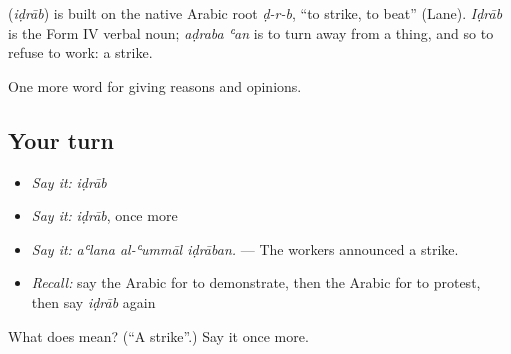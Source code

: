 \begin{cousinweb}
\textbf{} (\emph{iḍrāb}) is built on the native Arabic root \emph{ḍ-r-b}, \textquotedblleft{}to strike, to beat\textquotedblright{} (Lane). \emph{Iḍrāb} is the Form IV verbal noun; \emph{aḍraba ʿan} is to turn away from a thing, and so to refuse to work: a strike.
\end{cousinweb}

\begin{grammarlens}[title={What you've built}]
One more word for giving reasons and opinions.
\end{grammarlens}

\subsection*{Your turn}
\begin{itemize}
\raggedright
  \item \emph{Say it:} \emph{iḍrāb}
  \item \emph{Say it:} \emph{iḍrāb}, once more
  \item \emph{Say it:} \emph{aʿlana al-ʿummāl iḍrāban.} — The workers announced a strike.
  \item \emph{Recall:} say the Arabic for to demonstrate, then the Arabic for to protest, then say \emph{iḍrāb} again
\end{itemize}

\begin{tcolorbox}[breakable,colback=teal!4,colframe=teal!35!black,title={Before you move on}]
What does  mean? (\textquotedblleft{}A strike\textquotedblright{}.) Say it once more.
\end{tcolorbox}
